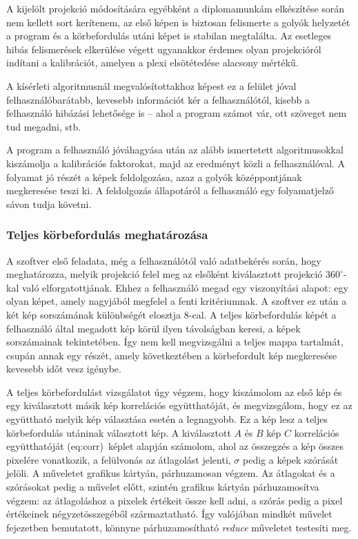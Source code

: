 \documentclass[a4paper,12pt]{article}
\begin{document}
A kijelölt projekció módosítására egyébként a diplomamunkám elkészítése során nem kellett sort kerítenem, az első képen is biztosan felismerte a golyók helyzetét a program és a körbefordulás utáni képet is stabilan megtalálta. Az esetleges hibás felismerések elkerülése végett ugyanakkor érdemes olyan projekcióról indítani a kalibrációt, amelyen a plexi elsötétedése alacsony mértékű.


A kísérleti algoritmusnál megvalósítottakhoz  képest ez a felület jóval felhasználóbarátabb, kevesebb információt kér a felhasználótól, kisebb a felhasználó hibázási lehetősége is -- ahol a program számot vár, ott szöveget nem tud megadni, stb.

A program a felhasználó jóváhagyása után az alább ismertetett algoritmusokkal kiszámolja a kalibrációs faktorokat, majd az eredményt közli a felhasználóval. A folyamat  jó részét a képek feldolgozása, azaz a golyók középpontjának megkeresése teszi ki. A feldolgozás állapotáról a felhasználó egy folyamatjelző sávon tudja követni.






\subsubsection{Teljes körbefordulás meghatározása}

A szoftver első feladata, még a felhasználótól való adatbekérés során, hogy meghatározza, melyik projekció felel meg az elsőként kiválasztott projekció $360^\circ$-kal való elforgatottjának. Ehhez a felhasználó megad egy viszonyítási alapot: egy olyan képet, amely nagyjából megfelel a fenti kritériumnak. A szoftver ez után a két kép sorszámának különbségét elosztja $8$-cal. A teljes körbefordulás képét a felhasználó által megadott kép körül ilyen távolságban keresi, a képek sorszámainak tekintetében. Így nem kell megvizsgálni a teljes mappa tartalmát, csupán annak egy részét, amely következtében a körbefordult kép megkeresése kevesebb időt vesz igénybe. 


A teljes körbefordulást vizsgálatot úgy végzem, hogy kiszámolom az első kép és egy kiválasztott másik kép korrelációs együtthatóját, és  megvizsgálom, hogy ez az együttható melyik kép választása esetén a legnagyobb. Ez a kép lesz a teljes körbefordulás utáninak választott kép. A kiválasztott $A$ és $B$  kép $C$ korrelációs együtthatóját \aref({eq:corr})~képlet alapján számolom, ahol az összegzés a kép összes pixelére vonatkozik, a felülvonás az átlagolást jelenti, $\sigma$ pedig a képek szórását jelöli. A műveletet grafikus kártyán, párhuzamosan végzem. Az átlagokat és a szórásokat pedig a művelet előtt, szintén grafikus kártyán párhuzamosítva végzem: az átlagoláshoz a pixelek értékeit össze kell adni, a szórás pedig a pixel értékeinek négyzetösszegéből származtatható. Így valójában mindkét művelet  fejezetben bemutatott, könnyne párhuzamosítható \emph{reduce} műveletet testesíti meg.
\end{document}
